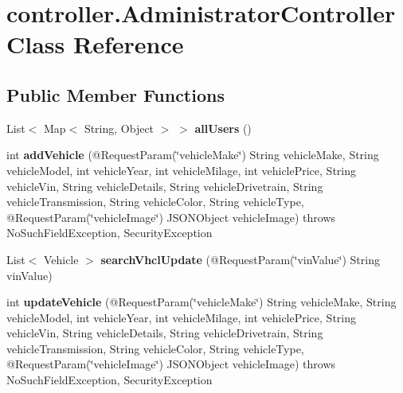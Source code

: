 \hypertarget{classcontroller_1_1_administrator_controller}{}\section{controller.\+Administrator\+Controller Class Reference}
\label{classcontroller_1_1_administrator_controller}
\subsection*{Public Member Functions}
\begin{DoxyCompactItemize}
\item 
\mbox{\label{classcontroller_1_1_administrator_controller_ac8a09e33341a586b92d44b178b2a118c}} 
List$<$ Map$<$ String, Object $>$ $>$ {\bfseries all\+Users} ()
\item 
\mbox{\label{classcontroller_1_1_administrator_controller_a20872fa84d1b82d5d6cdd2d4bac82b1d}} 
int {\bfseries add\+Vehicle} (@Request\+Param(\char`\"{}vehicle\+Make\char`\"{}) String vehicle\+Make, String vehicle\+Model, int vehicle\+Year, int vehicle\+Milage, int vehicle\+Price, String vehicle\+Vin, String vehicle\+Details, String vehicle\+Drivetrain, String vehicle\+Transmission, String vehicle\+Color, String vehicle\+Type, @Request\+Param(\char`\"{}vehicle\+Image\char`\"{}) J\+S\+O\+N\+Object vehicle\+Image)  throws No\+Such\+Field\+Exception, Security\+Exception 
\item 
\mbox{\label{classcontroller_1_1_administrator_controller_a1b6007434ec9c97231db9474e8287902}} 
List$<$ Vehicle $>$ {\bfseries search\+Vhcl\+Update} (@Request\+Param(\char`\"{}vin\+Value\char`\"{}) String vin\+Value)
\item 
\mbox{\label{classcontroller_1_1_administrator_controller_af1d159b09da447f4980b8e5dadfdd9bd}} 
int {\bfseries update\+Vehicle} (@Request\+Param(\char`\"{}vehicle\+Make\char`\"{}) String vehicle\+Make, String vehicle\+Model, int vehicle\+Year, int vehicle\+Milage, int vehicle\+Price, String vehicle\+Vin, String vehicle\+Details, String vehicle\+Drivetrain, String vehicle\+Transmission, String vehicle\+Color, String vehicle\+Type, @Request\+Param(\char`\"{}vehicle\+Image\char`\"{}) J\+S\+O\+N\+Object vehicle\+Image)  throws No\+Such\+Field\+Exception, Security\+Exception 

\end{DoxyCompactItemize}
